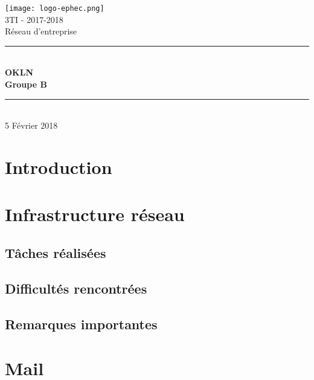 \documentclass{article}
\begin{document}
\begin{titlepage}
\begin{center}

\texttt{[image: logo-ephec.png]}\\[1cm]
{\large 3TI - 2017-2018}\\[0.5cm]

{\large Réseau d'entreprise}\\[0.8cm]
\newcommand{\HRule}{\rule{\linewidth}{0.5mm}}
\HRule \\[0.7cm]
{\huge \bfseries OKLN\\[0.75cm] }
{\bfseries Groupe B }\\[1cm]
\HRule \\[2.5cm]


5 Février 2018

\end{center}
\end{titlepage}


\section{Introduction}


\section{Infrastructure réseau}
    \subsection{Tâches réalisées}
   
    \subsection{Difficultés rencontrées}
    
    \subsection{Remarques importantes}
   

\section{Mail}
\end{document}
